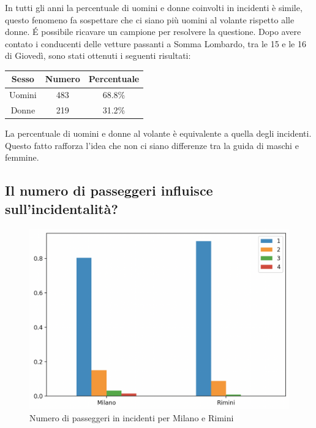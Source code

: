 \documentclass[a4paper]{report}
\begin{document}
In tutti gli anni la percentuale di uomini e donne coinvolti in incidenti è simile, 
questo fenomeno fa sospettare che ci siano più uomini al volante rispetto alle donne.
\'E possibile ricavare un campione per resolvere la questione. 
Dopo avere contato i conducenti delle vetture passanti a Somma Lombardo, tra le 15 e le 16 
di Giovedì, sono stati ottenuti i seguenti risultati:

\begin{center}
    \def\arraystretch{1.5}%
    \begin{tabular}{ |c|c|c| }
        \hline
        Sesso & Numero & Percentuale \\ 
        \hline
        \rowcolor{TableGray}
        Uomini & 483 & 68.8\% \\
        Donne & 219 & 31.2\% \\
        \hline
    \end{tabular}
\end{center}

La percentuale di uomini e donne al volante è equivalente a quella degli incidenti.
Questo fatto rafforza l'idea che non ci siano differenze tra la guida di maschi e femmine.


\subsection{Il numero di passeggeri influisce sull'incidentalità?}

\begin{figure}
    \includegraphics[width=\linewidth]{../src/incidenti/incidenti_senza_coords/tipo_veicoli/passeggeri.png}
    \caption{Numero di passeggeri in incidenti per Milano e Rimini}
    \label{fig:passeggeri-milano-rimini}
\end{figure}
\end{document}
